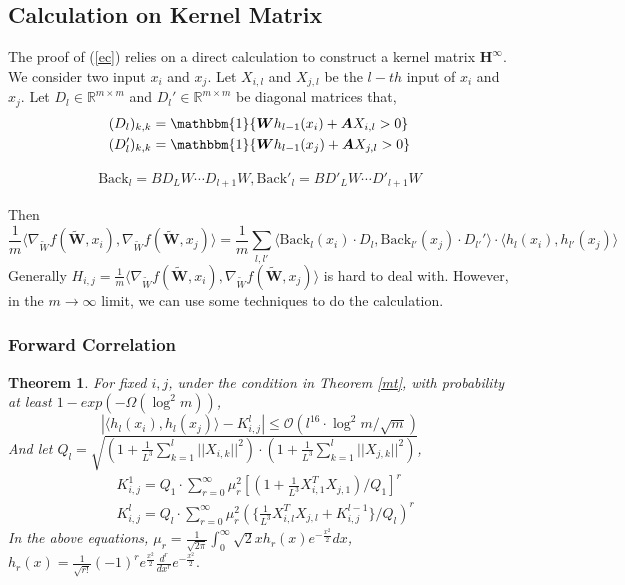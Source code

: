 \documentclass{article}
\newcommand{\cO}{\mathcal{O}}
\newtheorem{theo}{\textbf{Theorem}}
\begin{document}
\subsection{Calculation on Kernel Matrix}
The proof of (\ref{ec}) relies on a direct calculation to construct a kernel matrix $\bm{H}^\infty$.  We consider two input $x_i$ and $x_j$. Let $X_{i,l}$ and $X_{j,l}$ be the $l-th$ input of $x_i$ and $x_j$. Let $D_l\in \mathbb{R}^{m\times m}$ and $D_l'\in \mathbb{R}^{m\times m}$ be diagonal matrices that,
\begin{equation}
\begin{aligned}
&(D_l)_{k,k}=\mathbbm{1}\{\bm{W}h_{l-1}(x_i)+\bm{A}X_{i,l}>0\}\\
&(D'_l)_{k,k}=\mathbbm{1}\{\bm{W}h_{l-1}(x_j)+\bm{A}X_{j,l}>0\}
\end{aligned}
\end{equation}

\begin{equation}
\begin{aligned}
\text{Back}_l=BD_LW\cdots D_{l+1}W, \text{Back}'_l=BD'_LW\cdots D'_{l+1}W
\end{aligned}
\end{equation}

Then
\begin{equation}
\frac{1}{m}\langle \nabla_{\widetilde{W}} f(\widetilde{\bm{W}},x_i),\nabla_{\widetilde{W}} f(\widetilde{\bm{W}},x_j) \rangle=\frac{1}{m}\sum_{l,l'}\langle \text{Back}_l(x_i)\cdot D_l,\text{Back}_{l'}(x_j)\cdot D_{l'}' \rangle\cdot \langle h_l(x_i), h_{l'}(x_j)\rangle
\end{equation}
 Generally $H_{i,j}= \frac{1}{m}\langle \nabla_{\widetilde{W}} f(\widetilde{\bm{W}},x_i),\nabla_{\widetilde{W}} f(\widetilde{\bm{W}},x_j) \rangle$ is hard to deal with. However, in the $m\to \infty$ limit, we can use some techniques to do the calculation.


\subsubsection{Forward Correlation}\label{f1}
\begin{theo}\label{tt5}
For fixed $i,j$, under the condition in Theorem \ref{mt}, with probability at least $1-exp(-\Omega(\log^2m))$,
\begin{equation}
|\langle h_l(x_i),h_l(x_j) \rangle -K^l_{i,j}|\leq \cO(l^{16}\cdot\log^2 m/\sqrt{m})
\end{equation}
And let $Q_l=\sqrt{(1+\frac{1}{L^3}\sum_{k=1}^l||X_{i,k}||^2)\cdot(1+\frac{1}{L^3}\sum_{k=1}^l||X_{j,k}||^2) }$,
\begin{equation}\label{ek}
\begin{aligned}
&K^1_{i,j}= Q_1\cdot \sum_{r=0}^\infty \mu^2_r [(1+\frac{1}{L^3}X_{i,1}^TX_{j,1})/Q_1]^r\\
&K^{l}_{i,j}=Q_l\cdot \sum_{r=0}^\infty \mu^2_r (\{\frac{1}{L^3}X_{i,l}^TX_{j,l}+ K^{l-1}_{i,j}\}/Q_l)^r
\end{aligned}
\end{equation}
In the above equations, $\mu_r=\frac{1}{\sqrt{2\pi}}\int_0^\infty \sqrt{2}xh_r(x)e^{-\frac{x^2}{2}}dx$, $h_r(x)=\frac{1}{\sqrt{r!}}(-1)^re^{\frac{x^2}{2}}\frac{d^r}{dx^r}e^{-\frac{x^2}{2}}.$
\end{theo}
\end{document}
